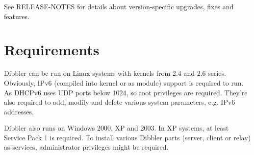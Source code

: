 See RELEASE-NOTES for details about version-specific upgrades, fixes
and features.

\section{Requirements}

Dibbler can be run on Linux systems with kernels from 2.4 and 2.6
series. Obviously, IPv6 (compiled into kernel or as module) support is
required to run. As DHCPv6 uses UDP ports below 1024, so root privileges
are required. They're also required to add, modify and delete various
system parameters, e.g. IPv6 addresses.

Dibbler also runs on Windows 2000, XP and 2003. In XP systems, at least
Service Pack 1 is required. To install various Dibbler parts (server,
client or relay) as services, administrator privileges might be
required. 
